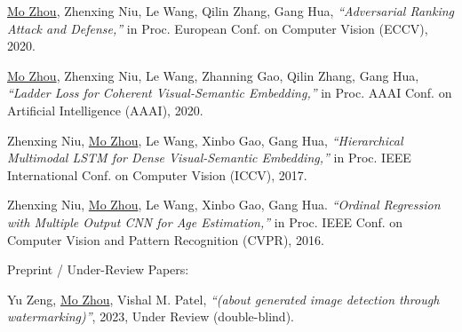 \documentclass[10pt,margin,line,pifont,palatino,courier]{res}
\begin{document}
\begin{resume}
\begin{enumerate}[noitemsep, leftmargin=*, label={[C0{\arabic*}]}]
\item \underline{Mo Zhou},
\reversemarginpar{}
Zhenxing Niu, Le Wang, Qilin Zhang, Gang Hua,
\textit{``Adversarial Ranking Attack and Defense,''}
in Proc. European Conf. on Computer Vision (ECCV), 2020.

\item  \underline{Mo Zhou},
\reversemarginpar{}
Zhenxing Niu, Le Wang, Zhanning Gao, Qilin Zhang, Gang Hua,
\textit{``Ladder Loss for Coherent Visual-Semantic Embedding,''}
in Proc. AAAI Conf. on Artificial Intelligence (AAAI), 2020.

\item Zhenxing Niu,
\reversemarginpar{}
\underline{Mo Zhou}, Le Wang, Xinbo Gao, Gang Hua,
\textit{``Hierarchical Multimodal LSTM for Dense Visual-Semantic Embedding,''}
in Proc. IEEE International Conf. on Computer Vision (ICCV), 2017.

\item Zhenxing Niu,
\reversemarginpar{}
\underline{Mo Zhou}, Le Wang, Xinbo Gao, Gang Hua.
\textit{``Ordinal Regression with Multiple Output CNN for Age Estimation,''}
in Proc. IEEE Conf. on Computer Vision and Pattern Recognition (CVPR), 2016.

\end{enumerate}

	{\sc Preprint / Under-Review Papers:}\\

\begin{enumerate}[noitemsep, leftmargin=*, label={[X0{\arabic*}]}]

\item Yu Zeng, \underline{Mo Zhou}, Vishal M. Patel,
\textit{``(about generated image detection through watermarking)''},
2023, Under Review (double-blind).


\end{enumerate}
\end{resume}
\end{document}
